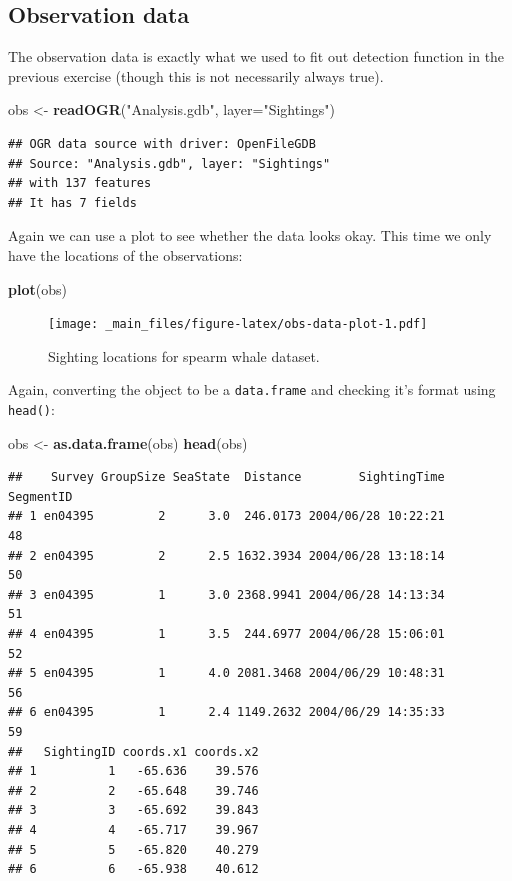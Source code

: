 \documentclass[]{book}
\newenvironment{Shaded}{\begin{snugshade}}{\end{snugshade}}
\newcommand{\KeywordTok}[1]{\textcolor[rgb]{0.13,0.29,0.53}{\textbf{#1}}}
\newcommand{\DataTypeTok}[1]{\textcolor[rgb]{0.13,0.29,0.53}{#1}}
\newcommand{\StringTok}[1]{\textcolor[rgb]{0.31,0.60,0.02}{#1}}
\newcommand{\NormalTok}[1]{#1}
\theoremstyle{definition}
\theoremstyle{definition}
\theoremstyle{remark}
\begin{document}
\subsection{Observation data}\label{observation-data}

The observation data is exactly what we used to fit out detection
function in the previous exercise (though this is not necessarily always
true).

\begin{Shaded}
\begin{Highlighting}[]
\NormalTok{obs <-}\StringTok{ }\KeywordTok{readOGR}\NormalTok{(}\StringTok{"Analysis.gdb"}\NormalTok{, }\DataTypeTok{layer=}\StringTok{"Sightings"}\NormalTok{)}
\end{Highlighting}
\end{Shaded}

\begin{verbatim}
## OGR data source with driver: OpenFileGDB 
## Source: "Analysis.gdb", layer: "Sightings"
## with 137 features
## It has 7 fields
\end{verbatim}

Again we can use a plot to see whether the data looks okay. This time we
only have the locations of the observations:

\begin{Shaded}
\begin{Highlighting}[]
\KeywordTok{plot}\NormalTok{(obs)}
\end{Highlighting}
\end{Shaded}

\begin{figure}
\centering
\texttt{[image: \_main\_files/figure-latex/obs-data-plot-1.pdf]}
\caption{\label{fig:obs-data-plot}Sighting locations for spearm whale
dataset.}
\end{figure}

Again, converting the object to be a \texttt{data.frame} and checking
it's format using \texttt{head()}:

\begin{Shaded}
\begin{Highlighting}[]
\NormalTok{obs <-}\StringTok{ }\KeywordTok{as.data.frame}\NormalTok{(obs)}
\KeywordTok{head}\NormalTok{(obs)}
\end{Highlighting}
\end{Shaded}

\begin{verbatim}
##    Survey GroupSize SeaState  Distance        SightingTime SegmentID
## 1 en04395         2      3.0  246.0173 2004/06/28 10:22:21        48
## 2 en04395         2      2.5 1632.3934 2004/06/28 13:18:14        50
## 3 en04395         1      3.0 2368.9941 2004/06/28 14:13:34        51
## 4 en04395         1      3.5  244.6977 2004/06/28 15:06:01        52
## 5 en04395         1      4.0 2081.3468 2004/06/29 10:48:31        56
## 6 en04395         1      2.4 1149.2632 2004/06/29 14:35:33        59
##   SightingID coords.x1 coords.x2
## 1          1   -65.636    39.576
## 2          2   -65.648    39.746
## 3          3   -65.692    39.843
## 4          4   -65.717    39.967
## 5          5   -65.820    40.279
## 6          6   -65.938    40.612
\end{verbatim}
\end{document}
